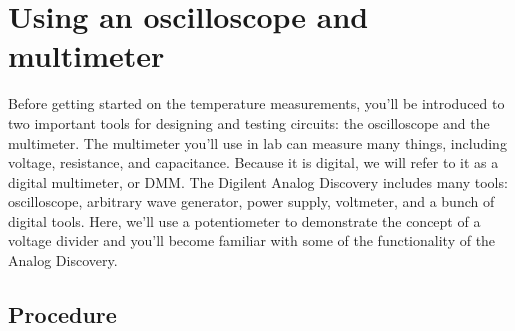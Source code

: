 \documentclass[11pt]{article} %
\begin{document}
\section*{Using an oscilloscope and multimeter}

Before getting started on the temperature measurements, you’ll be introduced to two important tools for designing and testing circuits: the oscilloscope and the multimeter. The multimeter you’ll use in lab can measure many things, including voltage, resistance, and capacitance. Because it is digital, we will refer to it as a digital multimeter, or DMM. The Digilent Analog Discovery includes many tools: oscilloscope, arbitrary wave generator, power supply, voltmeter, and a bunch of digital tools. Here, we’ll use a potentiometer to demonstrate the concept of a voltage divider and you’ll become familiar with some of the functionality of the Analog Discovery.

\subsection*{Procedure}
\end{document}
